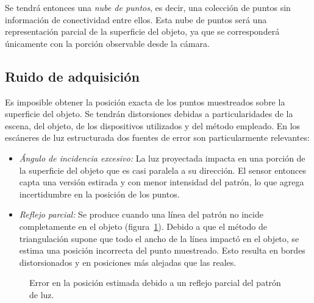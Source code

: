 Se tendrá entonces una \emph{nube de puntos}, es decir, una colección de puntos
sin información de conectividad entre ellos.
Esta nube de puntos será una representación parcial de la superficie del objeto,
ya que se corresponderá únicamente con la porción observable desde la cámara.


\subsection{Ruido de adquisición}
Es imposible obtener la posición exacta de los puntos muestreados sobre la superficie del objeto.
Se tendrán distorsiones debidas a particularidades de la escena, del objeto, de los
dispositivos utilizados y del método empleado.
En los escáneres de luz estructurada dos fuentes de error son particularmente relevantes:
\begin{itemize}
	\item \emph{Ángulo de incidencia excesivo:}
		La luz proyectada impacta en una porción de la superficie del objeto
		que es casi paralela a su dirección.
		El sensor entonces capta una versión estirada y con menor intensidad del patrón, %
		lo que agrega incertidumbre en la posición de los puntos.
	\item \emph{Reflejo parcial:}
		Se produce cuando una línea del patrón no incide completamente en el objeto (figura~\ref{fig:error_adquisicion}).
		Debido a que el método de triangulación supone que todo el ancho de la línea impactó en el objeto,
		se estima una posición incorrecta del punto muestreado.
		Esto resulta en bordes distorsionados y en posiciones más alejadas que las reales.\cite{Turk:1994:ZPM:192161.192241}
\end{itemize}

\begin{figure}
		\caption{\label{fig:error_adquisicion}Error en la posición estimada debido a un reflejo parcial del patrón de luz.}
\end{figure}

\endinput

